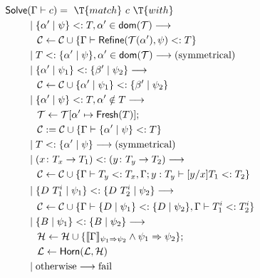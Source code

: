 \documentclass[10pt,preprint]{sigplanconf-pldi16}
\theoremstyle{definition}
\newcommand{\Implies}{\Rightarrow}
\renewcommand{\And}{\wedge}
\newcommand{\Subt}{<:}
\newcommand{\env}{\Gamma}
\newcommand{\funT}[3]{{#1}\colon {#2} \to {#3}}
\newcommand{\refine}{\mathsf{Refine}}
\newcommand{\fresh}{\mathsf{Fresh}}
\newcommand{\solve}{\mathsf{Solve}}
\newcommand{\horn}{\mathsf{Horn}}
\newcommand{\dom}{\mathsf{dom}}
\newcommand{\constraints}{\mathcal{C}}
\newcommand{\horns}{\mathcal{H}}
\newcommand{\typeass}{\mathcal{T}}
\newcommand{\liquidass}{\mathcal{L}}
\begin{document}
\begin{figure}
\small
\begin{align}
\nonumber\solve&(\env\vdash c) =\ \T{match}\ c\ \T{with}\\
\nonumber        &\mid  \{\alpha'\mid\psi\} \Subt T, \alpha'\in \dom(\typeass)  \longrightarrow\\
\label{fml:subst-l}      &\quad \constraints \gets \constraints \cup \{\env\vdash \refine(\typeass(\alpha'), \psi) \Subt T\}\\
\label{fml:subst-r}    &\mid  T \Subt \{\alpha'\mid\psi\}, \alpha'\in \dom(\typeass)  \longrightarrow\text{(symmetrical)}\\
\nonumber        &\mid  \{\alpha'\mid\psi_1\} \Subt \{\beta'\mid\psi_2\}  \longrightarrow\\ 
\label{fml:vars}      &\quad \constraints \gets \constraints \cup \{\alpha'\mid\psi_1\} \Subt \{\beta'\mid\psi_2\}\\
\nonumber        &\mid  \{\alpha'\mid\psi\} \Subt T, \alpha'\notin T  \longrightarrow \\
\nonumber        &\quad \typeass \gets \typeass[\alpha'\mapsto \fresh(T)];\\
\label{fml:fresh-l}    &\quad \constraints := \constraints\cup \{\env\vdash \{\alpha'\mid\psi\} \Subt T\} \\
\label{fml:fresh-r}    &\mid  T\Subt\{\alpha'\mid\psi\} \longrightarrow \text{(symmetrical)} \\
\nonumber        &\mid  (\funT{x}{T_x}{T_1}) \Subt (\funT{y}{T_y}{T_2}) \longrightarrow \\
\label{fml:fun} &\quad \constraints \gets \constraints \cup \{\env\vdash T_y \Subt T_x, \env;y: T_y\vdash [y/x]T_1\Subt T_2\} \\
\nonumber        &\mid  \{D\ T^i_1 \mid \psi_1\} \Subt \{D\ T^i_2 \mid \psi_2\} \longrightarrow \\
\label{fml:datatype} &\quad \constraints \gets \constraints \cup \{\env\vdash\{D \mid \psi_1\} \Subt \{D \mid \psi_2\}, \env\vdash T^i_1 \Subt T^i_2\} \\
\nonumber        &\mid  \{B \mid \psi_1\} \Subt \{B \mid \psi_2\}  \longrightarrow \\
\label{fml:base-invalid}  &\quad \horns \gets \horns\cup \{\llbracket\env\rrbracket_{\psi_1\Implies \psi_2}\And\psi_1\Implies \psi_2\};\\ 
\nonumber                 &\quad \liquidass \gets \horn(\liquidass,\horns) \\
            &\mid  \text{otherwise}  \longrightarrow \text{fail}

\end{align}
\end{figure}
\end{document}
